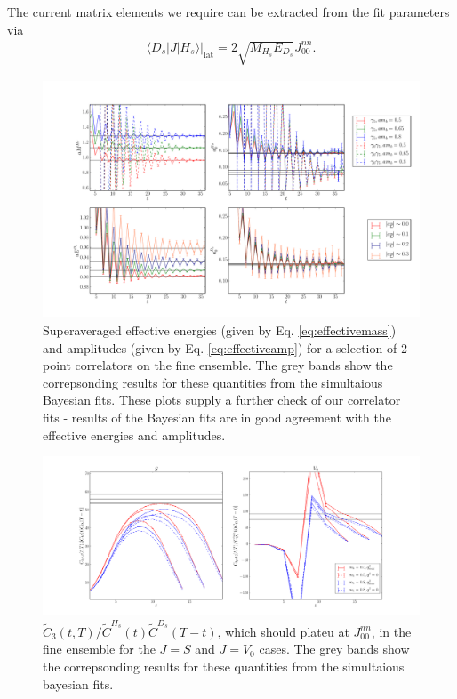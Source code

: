 The current matrix elements we require can be extracted from the fit parameters via
\begin{align}
  \langle D_s| J | H_s \rangle |_{\text{lat}} = 2 \sqrt{M_{H_s}E_{D_s}} J^{nn}_{00}.
  \label{eq:currentfit}
\end{align}

\begin{figure}[htb!]
  \hspace{-30pt}
    \hspace{-10pt}
    \includegraphics[width=1.2\textwidth]{images/BsDs/fine_2pt_summary.pdf}
    \caption{
Superaveraged effective energies (given by Eq. \eqref{eq:effectivemass}) and amplitudes (given by Eq. \eqref{eq:effectiveamp}) for a selection of 2-point correlators on the fine ensemble. The grey bands show the correpsonding results for these quantities from the simultaious Bayesian fits. These plots supply a further check of our correlator fits - results of the Bayesian fits are in good agreement with the effective energies and amplitudes.  \label{fig:2ptcorrs_BsDs}}
\end{figure}

\begin{figure}[htb!]
    \hspace{-60pt}
    \includegraphics[width=1.3\textwidth]{images/BsDs/fine_3pt_summary.pdf}
    \caption{$\tilde{C}_3(t,T)/\tilde{C}^{H_s}(t) \tilde{C}^{D_s}(T-t)$, which should plateu at $J_{00}^{nn}$, in the fine ensemble for the $J=S$ and $J=V_0$ cases. The grey bands show the correpsonding results for these quantities from the simultaious bayesian fits.\label{fig:3ptcorrs_BsDs}}
\end{figure}

